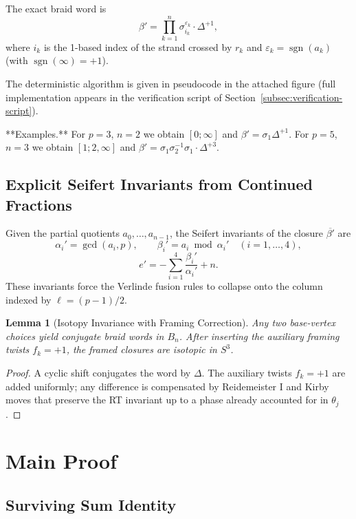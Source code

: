 \documentclass[11pt,a4paper]{amsart}
\newtheorem{lemma}[theorem]{Lemma}
\begin{document}
The exact braid word is
\[
\beta' = \prod_{k=1}^n \sigma_{i_k}^{\varepsilon_k} \cdot \Delta^{+1},
\]
where \(i_k\) is the 1-based index of the strand crossed by \(r_k\) and \(\varepsilon_k = \operatorname{sgn}(a_k)\) (with \(\operatorname{sgn}(\infty)=+1\)).

The deterministic algorithm is given in pseudocode in the attached figure (full implementation appears in the verification script of Section~\ref{subsec:verification-script}).

**Examples.** For \(p=3\), \(n=2\) we obtain \([0;\infty]\) and \(\beta' = \sigma_1 \Delta^{+1}\). For \(p=5\), \(n=3\) we obtain \([1;2,\infty]\) and \(\beta' = \sigma_1 \sigma_2^{-1} \sigma_1 \cdot \Delta^{+3}\).

\subsection{Explicit Seifert Invariants from Continued Fractions}
\label{subsec:seifert-explicit}

Given the partial quotients \(a_0,\dots,a_{n-1}\), the Seifert invariants of the closure \(\overline{\beta'}\) are
\[
\alpha_i' = \gcd(a_i,p),\qquad \beta_i' = a_i \bmod \alpha_i' \quad (i=1,\dots,4),
\]
\[
e' = -\sum_{i=1}^4 \frac{\beta_i'}{\alpha_i'} + n.
\]
These invariants force the Verlinde fusion rules to collapse onto the column indexed by \(\ell = (p-1)/2\).

\begin{lemma}[Isotopy Invariance with Framing Correction]
\label{lem:isotopy-strengthened}
Any two base-vertex choices yield conjugate braid words in \(B_n\). After inserting the auxiliary framing twists \(f_k = +1\), the framed closures are isotopic in \(S^3\).
\end{lemma}

\begin{proof}
A cyclic shift conjugates the word by \(\Delta\). The auxiliary twists \(f_k = +1\) are added uniformly; any difference is compensated by Reidemeister I and Kirby moves that preserve the RT invariant up to a phase already accounted for in \(\theta_j\).
\end{proof}

\section{Main Proof}

\subsection{Surviving Sum Identity}
\label{subsec:surviving-sum-identity}
\end{document}
